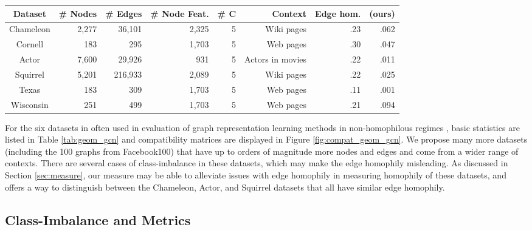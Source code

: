 \documentclass[sigconf, balance=false]{acmart}
\begin{document}
\begin{table*}[t]
    \centering
\vspace{10pt}
    {\small
    \begin{tabular}{crrrrrrr}
    \toprule
    Dataset & \# Nodes & \# Edges &  \# Node Feat. & \# C & Context & Edge hom. &  (ours) \\
    \midrule
         Chameleon & 2,277 & 36,101 & 2,325 & 5 & Wiki pages & .23 & .062\\
         Cornell & 183 & 295 & 1,703 & 5 & Web pages & .30 & .047\\
         Actor & 7,600 & 29,926 & 931 & 5 & Actors in movies  & .22 & .011\\
         Squirrel & 5,201 & 216,933 & 2,089 & 5 & Wiki pages & .22 & .025\\
         Texas  & 183 & 309 & 1,703 & 5 & Web pages & .11 & .001\\
         Wisconsin & 251 & 499 & 1,703 & 5 & Web pages & .21 & .094\\
    \bottomrule
    \end{tabular}
    }
    \vspace{5pt}
    \caption{Statistics for datasets from \citet{pei2019geom}. \#C is the number of node classes.}
    \label{tab:geom_gcn}
\end{table*}

For the six datasets in \citet{pei2019geom} often used in evaluation of graph representation learning methods in non-homophilous regimes \cite{zhu2020beyond}, basic statistics are listed in Table \ref{tab:geom_gcn} and compatibility matrices are displayed in Figure \ref{fig:compat_geom_gcn}. We propose many more datasets (including the 100 graphs from Facebook100) that have up to orders of magnitude more nodes and edges and come from a wider range of contexts. There are several cases of class-imbalance in these datasets, which may make the edge homophily misleading. As discussed in Section \ref{sec:measure}, our measure may be able to alleviate issues with edge homophily in measuring homophily of these datasets, and offers a way to distinguish between the Chameleon, Actor, and Squirrel datasets that all have similar edge homophily.



\subsection{Class-Imbalance and Metrics}
\end{document}
